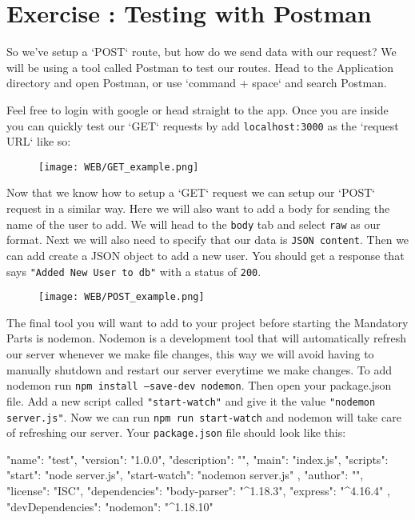 \documentclass{42-en}
\begin{document}
\chapter{Exercise \exercicenumber: Testing with Postman}

    So we've setup a `POST` route, but how do we send data with our request? We will be using a tool called Postman to test our routes. Head to the Application directory and open Postman, or use  `command + space` and search Postman.

    Feel free to login with google or head straight to the app. Once you are inside you can quickly test our `GET` requests by add \texttt{localhost:3000} as the `request URL` like so:

    \begin{figure}[H]
        \begin{center}
            \texttt{[image: WEB/GET\_example.png]}
        \end{center}
    \end{figure}

Now that we know how to setup a `GET` request we can setup our `POST` request in a similar way. Here we will also want to add a body for sending the name of the user to add. We will head to the \texttt{body} tab and select \texttt{raw} as our format. Next we will also need to specify that our data is \texttt{JSON content}. Then we can add create a JSON object to add a new user. You should get a response that says \texttt{"Added New User to db"} with a status of \texttt{200}.

    \begin{figure}[H]
        \begin{center}
            \texttt{[image: WEB/POST\_example.png]}
        \end{center}
    \end{figure}


The final tool you will want to add to your project before starting the Mandatory Parts is nodemon. Nodemon is a development tool that will automatically refresh our server whenever we make file changes, this way we will avoid having to manually shutdown and restart our server everytime we make changes. To add nodemon run \texttt{npm install --save-dev nodemon}. Then open your package.json file. Add a new script called \texttt{"start-watch"} and give it the value \texttt{"nodemon server.js"}. Now we can run \texttt{npm run start-watch} and nodemon will take care of refreshing our server. Your \texttt{package.json} file should look like this:
\begin{42jscode}
{
  "name": "test",
  "version": "1.0.0",
  "description": "",
  "main": "index.js",
  "scripts": {
    "start": "node server.js",
    "start-watch": "nodemon server.js"
  },
  "author": "",
  "license": "ISC",
  "dependencies": {
    "body-parser": "^1.18.3",
    "express": "^4.16.4"
  },
  "devDependencies": {
    "nodemon": "^1.18.10"
  }
}
\end{42jscode}
\end{document}
